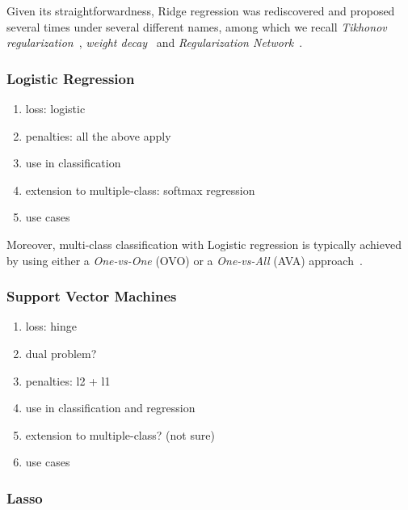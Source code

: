 			Given its straightforwardness, Ridge regression was rediscovered and proposed several times under several different names, among which we recall \textit{Tikhonov regularization}~\cite{tikhonov1963solution}, \textit{weight decay}~\cite{krogh1992simple} and \textit{Regularization Network}~\cite{evgeniou2000regularization}.

			\subsubsection{Logistic Regression}
			\begin{enumerate}
				\item loss: logistic
				\item penalties: all the above apply
				\item use in classification
				\item extension to multiple-class: softmax regression
				\item use cases
			\end{enumerate}


			Moreover, multi-class classification with Logistic regression is typically achieved by using either a \textit{One-vs-One} (OVO) or a \textit{One-vs-All} (AVA) approach~.

			\subsubsection{Support Vector Machines}
			\begin{enumerate}
				\item loss: hinge
				\item dual problem?
				\item penalties: l2 + l1
				\item use in classification and regression
				\item extension to multiple-class? (not sure)
				\item use cases
			\end{enumerate}

			\subsubsection{Lasso}

